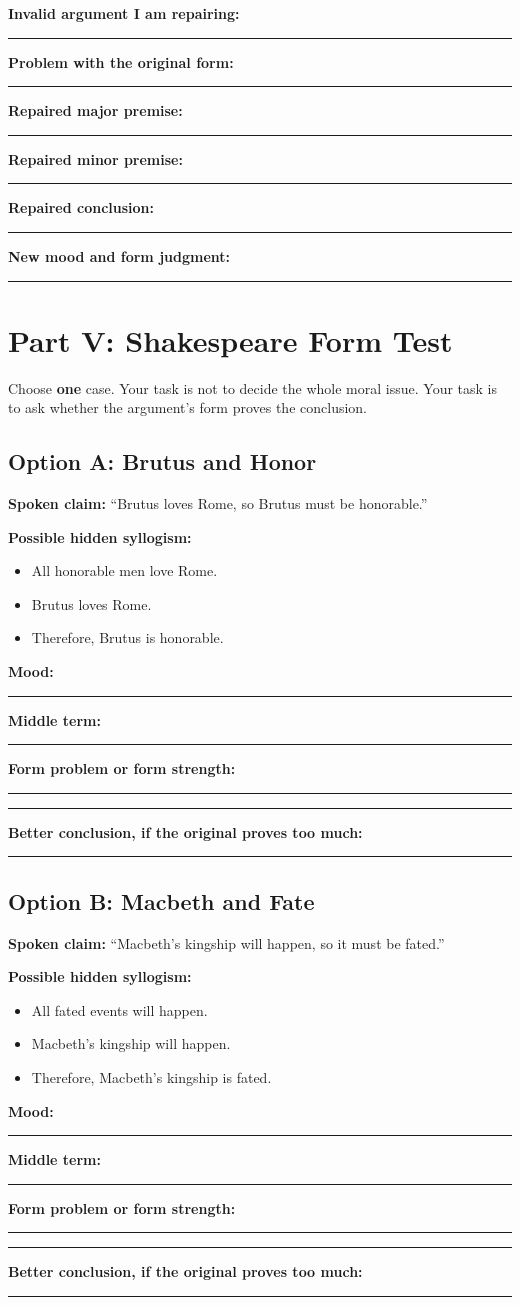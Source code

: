 \documentclass[12pt]{article}
\newcommand{\studentline}{\vspace{0.35em}\hrule\vspace{0.65em}}
\newcommand{\shortline}{\vspace{0.25em}\hrule\vspace{0.45em}}
\begin{document}
\textbf{Invalid argument I am repairing:}\studentline
\textbf{Problem with the original form:}\studentline
\textbf{Repaired major premise:}\studentline
\textbf{Repaired minor premise:}\studentline
\textbf{Repaired conclusion:}\studentline
\textbf{New mood and form judgment:}\studentline

\section*{Part V: Shakespeare Form Test}
Choose \textbf{one} case. Your task is not to decide the whole moral issue. Your task is to ask whether the argument's form proves the conclusion.

\subsection*{Option A: Brutus and Honor}
\textbf{Spoken claim:} ``Brutus loves Rome, so Brutus must be honorable.''

\textbf{Possible hidden syllogism:}
\begin{itemize}[leftmargin=*]
\item All honorable men love Rome.
\item Brutus loves Rome.
\item Therefore, Brutus is honorable.
\end{itemize}

\textbf{Mood:}\shortline
\textbf{Middle term:}\shortline
\textbf{Form problem or form strength:}\studentline\studentline
\textbf{Better conclusion, if the original proves too much:}\studentline

\subsection*{Option B: Macbeth and Fate}
\textbf{Spoken claim:} ``Macbeth's kingship will happen, so it must be fated.''

\textbf{Possible hidden syllogism:}
\begin{itemize}[leftmargin=*]
\item All fated events will happen.
\item Macbeth's kingship will happen.
\item Therefore, Macbeth's kingship is fated.
\end{itemize}

\textbf{Mood:}\shortline
\textbf{Middle term:}\shortline
\textbf{Form problem or form strength:}\studentline\studentline
\textbf{Better conclusion, if the original proves too much:}\studentline
\end{document}
